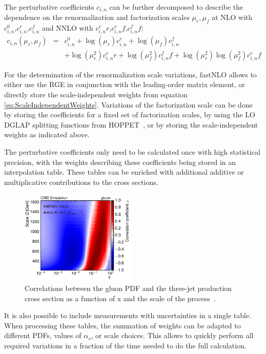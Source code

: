 \documentclass{PoS}
\begin{document}
The perturbative coefficients $c_{i,n}$ can be further decomposed to describe
the dependence on the renormalization and factorization scales $\mu_r, \mu_f$
at NLO with $c_{i,n}^0$,$c_{i,n}^r$,$c_{i,n}^f$ and NNLO with
$c_{i,n}^rr$,$c_{i,n}^rf$,$c_{i,n}^ff$:
\begin{eqnarray}\label{eq:ScaleIndependentWeights}
  c_{i,n}(\mu_r,\mu_f) &=& c_{i,n}^0 + \log(\mu_r)c_{i,n}^r +  \log(\mu_f) c_{i,n}^f \nonumber \\
     &&+ \log(\mu_r^2)c_{i,n}^rr + \log(\mu_f^2) c_{i,n}^ff + \log(\mu_r^2)\log(\mu_f^2) c_{i,n}^rf
\end{eqnarray}

For the determination of the renormalization scale variations, fastNLO allows
to either use the RGE in conjunction with the leading-order matrix element,
or directly store the scale-independent weights from equation \ref{eq:ScaleIndependentWeights}.
Variations of the factorization scale can be done by storing the
coefficients for a fixed set of factorization scales, by using the LO DGLAP
splitting functions from HOPPET~\cite{Salam:2008qg}, or by storing
the scale-independent weights as indicated above.

The perturbative coefficients only need to be calculated once with
high statistical precision, with the weights describing these
coefficients being stored in an interpolation table.
These tables can be enriched with additional additive or multiplicative
contributions to the cross sections.

\begin{figure}
 \centering
  \includegraphics[width=0.49\textwidth]{05_correlation_g_0_1}
  \caption{Correlations between the gluon PDF and the three-jet production cross section
  as a function of x and the scale of the process~\cite{CMS:2014mna}.}
  \label{Fig:correlations}
\end{figure}

It is also possible to include measurements with uncertainties in a single table.
When processing these tables, the summation of weights can be adapted
to different PDFs, values of $\alpha_s$, or scale choices. This allows to quickly perform
all required variations in a fraction of the time needed to do the full
calculation.
\end{document}
